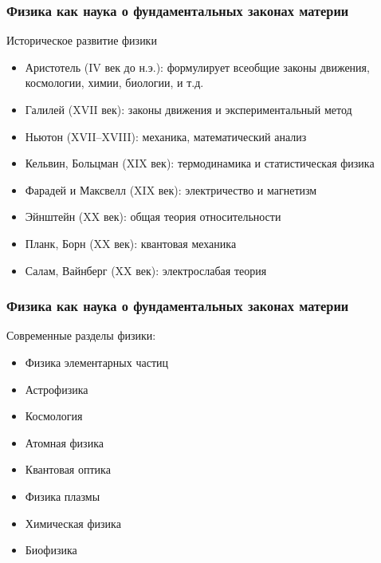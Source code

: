 \begin{frame}
    \frametitle{Физика как наука о фундаментальных законах материи}
    Историческое развитие физики
    \begin{itemize}[<+->]
        \item Аристотель (IV век до н.э.): формулирует всеобщие законы
            движения, космологии, химии, биологии, и т.д.
        \item Галилей (XVII век): законы движения и экспериментальный
            метод
        \item Ньютон (XVII--XVIII): механика, математический анализ
        \item Кельвин, Больцман (XIX век): термодинамика и
            статистическая физика
        \item Фарадей и Максвелл (XIX век): электричество и магнетизм
        \item Эйнштейн (XX век): общая теория относительности
        \item Планк, Борн (XX век): квантовая механика
        \item Салам, Вайнберг (XX век): электрослабая теория
    \end{itemize}
\end{frame}
\begin{frame}
    \frametitle{Физика как наука о фундаментальных законах материи}
    Современные разделы физики:
    \begin{itemize}[<+->]
        \item Физика элементарных частиц
        \item Астрофизика
        \item Космология
        \item Атомная физика
        \item Квантовая оптика
        \item Физика плазмы
        \item Химическая физика
        \item Биофизика
    \end{itemize}
\end{frame}

